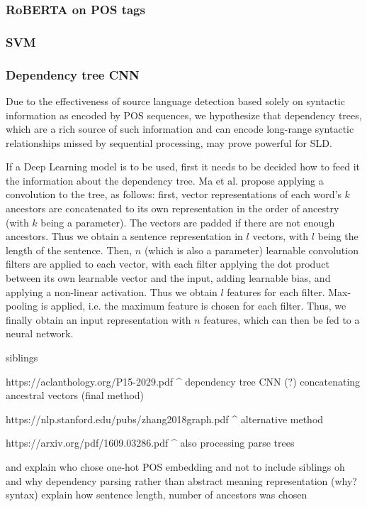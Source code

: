 \documentclass[twocolumn]{article}
\begin{document}
\subsubsection*{RoBERTA on POS tags}

\subsubsection*{SVM}

\subsubsection*{Dependency tree CNN}

Due to the effectiveness of source language detection based solely on syntactic information as encoded by POS sequences, we hypothesize that dependency trees, which are a rich source of such information and can encode long-range syntactic relationships missed by sequential processing, may prove powerful for SLD.

If a Deep Learning model is to be used, first it needs to be decided how to feed it the information about the dependency tree. Ma et al. \cite{ancestors} propose applying a convolution to the tree, as follows: first, vector representations of each word's $k$ ancestors are concatenated to its own representation in the order of ancestry (with $k$ being a parameter). The vectors are padded if there are not enough ancestors. Thus we obtain a sentence representation in $l$ vectors, with $l$ being the length of the sentence. Then, $n$ (which is also a parameter) learnable convolution filters are applied to each vector, with each filter applying the dot product between its own learnable vector and the input, adding learnable bias, and applying a non-linear activation. Thus we obtain $l$ features for each filter. Max-pooling is applied, i.e. the maximum feature is chosen for each filter. Thus, we finally obtain an input representation with $n$ features, which can then be fed to a neural network.

siblings


https://aclanthology.org/P15-2029.pdf
^ dependency tree CNN (?) concatenating ancestral vectors (final method)

https://nlp.stanford.edu/pubs/zhang2018graph.pdf
^ alternative method

https://arxiv.org/pdf/1609.03286.pdf
^ also processing parse trees

and explain who chose one-hot POS embedding and not to include siblings oh and why dependency parsing rather than abstract meaning representation (why? syntax)
explain how sentence length, number of ancestors was chosen
\end{document}
